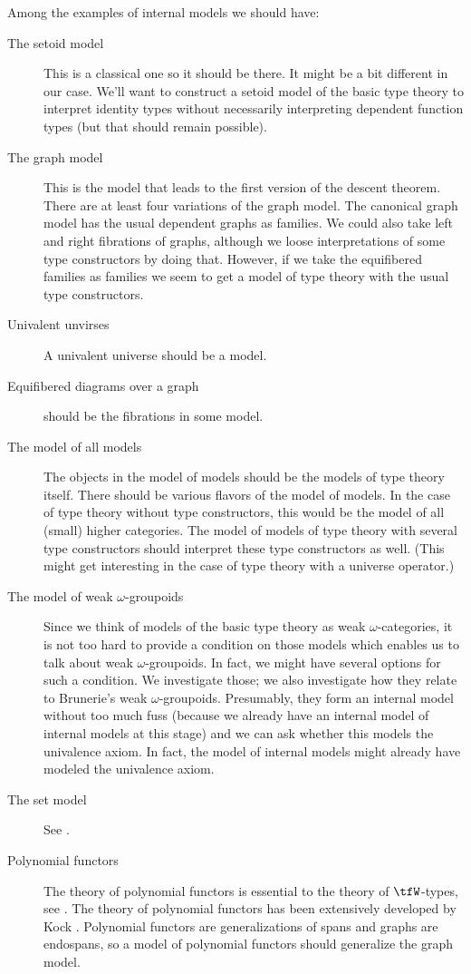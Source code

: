Among the examples of internal models we should have:
\begin{description}
\item[The setoid model] This is a classical one so it should be there. It might
      be a bit different in our case. We'll want to construct a setoid model
      of the basic type theory to interpret identity types without necessarily
      interpreting dependent function types (but that should remain possible).
\item[The graph model] This is the model that leads to the first version of the
      descent theorem. There are at least four variations of the graph model.
      The canonical graph model has the usual dependent graphs as families. We
      could also take left and right fibrations of graphs, although we loose
      interpretations of some type constructors by doing that. However, if we
      take the equifibered families as families we seem to get a model of type
      theory with the usual type constructors.
\item[Univalent unvirses] A univalent universe should be a model.
\item[Equifibered diagrams over a graph] should be the fibrations in some model.
\item[The model of all models] The objects in the model of models should be
      the models of type theory itself. There should be various flavors of the
      model of models. In the case of type theory without type constructors,
      this would be the model of all (small) higher categories. The model of
      models of type theory with several type constructors should interpret
      these type constructors as well. (This might get interesting in the case
      of type theory with a universe operator.)
\item[The model of weak $\omega$-groupoids] Since we think of models of the
      basic type theory as weak $\omega$-categories, it is not too hard to
      provide a condition on those models which enables us to talk about
      weak $\omega$-groupoids. In fact, we might have several options for such a
      condition. We investigate those; we also investigate how they relate to
      Brunerie's weak $\omega$-groupoids. Presumably, they form an internal
      model without too much fuss (because we already have an internal model
      of internal models at this stage) and we can ask whether this models
      the univalence axiom. In fact, the model of internal models might already
      have modeled the univalence axiom. 
\item[The set model] See \cite{RijkeSpitters:Sets}.
\item[Polynomial functors] The theory of polynomial functors is essential to the
      theory of $\tfW$-types, see \cite{MoerdijkPalmgren2000}. The theory of
      polynomial functors has been extensively developed by Kock \cite{Kock2011}.
      Polynomial functors are generalizations of spans and graphs are endospans,
      so a model of polynomial functors should generalize the graph model. 
\end{description}
